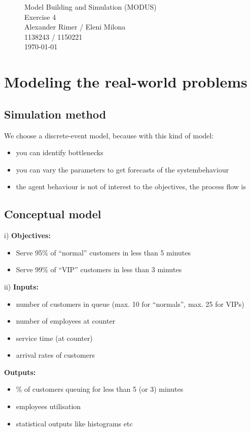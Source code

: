 \begin{figure}
\centering
{\Huge Model Building and Simulation (MODUS)}\\[0.5cm]
{\Huge Exercise 4}\\[0.5cm]
{\Large Alexander Rimer / Eleni Milona}\\[0.6cm]  
{\Large 1138243 / 1150221}\\[0.6cm]  
\today
\end{figure}

\section{Modeling the real-world problems}
\subsection{Simulation method}
We choose a discrete-event model, because with this kind of model:
\begin{itemize}
  	\item you can identify bottlenecks
	\item	you can vary the parameters to get forecasts of the systembehaviour
	\item	the agent behaviour is not of interest to the objectives, the process flow is
\end{itemize}

\subsection{Conceptual model}
i) 
	\textbf{Objectives:}
		\begin{itemize}	
		  \item Serve 95\% of ``normal'' customers in less than 5 minutes
		  \item Serve 99\% of ``VIP'' customers in less than 3 minutes
		\end{itemize}
ii) 	
	\textbf{Inputs:}
		\begin{itemize}	
		  \item number of customers in queue (max. 10 for ``normals'', max. 25 for VIPs)
		  \item number of employees at counter
		  \item service time (at counter)
		  \item arrival rates of customers
		\end{itemize}
		
	\textbf{Outputs:}
		\begin{itemize}	
		  \item \% of customers queuing for less than 5 (or 3) minutes
		  \item employees utilisation
		  \item statistical outputs like histograms etc
		\end{itemize}
		
